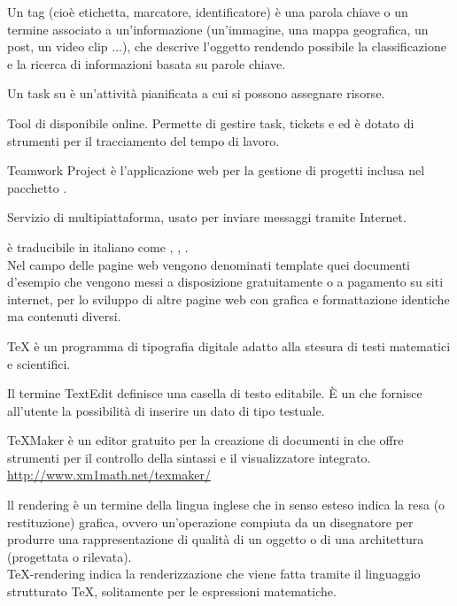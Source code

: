 Un tag (cioè etichetta, marcatore, identificatore) è una parola chiave o un termine associato a un'informazione (un'immagine, una mappa geografica, un post, un video clip ...), che descrive l'oggetto rendendo possibile la classificazione e la ricerca di informazioni basata su parole chiave.

Un task su  è un’attività pianificata a cui si possono assegnare risorse.

Tool di  disponibile online. Permette di gestire  task, tickets e  ed è dotato di strumenti per il tracciamento del tempo di lavoro.

Teamwork Project è l’applicazione web per la gestione di progetti inclusa nel pacchetto .

Servizio di  multipiattaforma, usato per inviare messaggi tramite Internet.

 è traducibile in italiano come , , .\\
Nel campo delle pagine web vengono denominati template quei documenti d'esempio che vengono messi a disposizione gratuitamente o a pagamento su siti internet, per lo sviluppo di altre pagine web con grafica e formattazione identiche ma contenuti diversi.

\TeX{} è un programma di tipografia digitale adatto alla stesura di testi matematici e scientifici.

Il termine TextEdit definisce una casella di testo editabile. È un  che fornisce all’utente la possibilità di inserire un dato di tipo testuale.

TeXMaker è un editor gratuito per la creazione di documenti in \glossario{\LaTeX} che offre strumenti per il controllo della sintassi e il visualizzatore integrato.\\
\url{http://www.xm1math.net/texmaker/}

ll rendering è un termine della lingua inglese che in senso esteso indica la resa (o restituzione) grafica, ovvero un'operazione compiuta da un disegnatore per produrre una rappresentazione di qualità di un oggetto o di una architettura (progettata o rilevata).\\
\TeX -rendering indica la renderizzazione che viene fatta tramite il linguaggio strutturato \TeX, solitamente per le espressioni matematiche.

